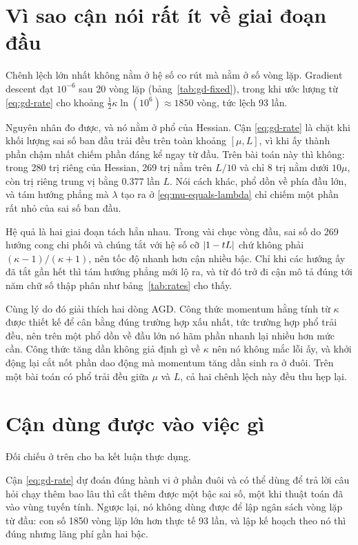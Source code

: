 \section{Vì sao cận nói rất ít về giai đoạn đầu}
\label{sec:theory-early}

Chênh lệch lớn nhất không nằm ở hệ số co rút mà nằm ở số vòng lặp. Gradient
descent đạt $10^{-6}$ sau 20 vòng lặp (bảng~\ref{tab:gd-fixed}), trong khi ước
lượng từ \eqref{eq:gd-rate} cho khoảng $\tfrac{1}{2}\kappa \ln(10^{6}) \approx
1850$ vòng, tức lệch 93 lần.

Nguyên nhân đo được, và nó nằm ở phổ của Hessian. Cận \eqref{eq:gd-rate} là chặt
khi khối lượng sai số ban đầu trải đều trên toàn khoảng $[\mu, L]$, vì khi ấy
thành phần chậm nhất chiếm phần đáng kể ngay từ đầu. Trên bài toán này thì không:
trong 280 trị riêng của Hessian, 269 trị nằm trên $L/10$ và chỉ 8 trị nằm dưới
$10\mu$, còn trị riêng trung vị bằng \num{0.377} lần $L$. Nói cách khác, phổ dồn
về phía đầu lớn, và tám hướng phẳng mà $\lambda$ tạo ra ở
\eqref{eq:mu-equals-lambda} chỉ chiếm một phần rất nhỏ của sai số ban đầu.

Hệ quả là hai giai đoạn tách hẳn nhau. Trong vài chục vòng đầu, sai số do 269
hướng cong chi phối và chúng tắt với hệ số cỡ $\lvert1 - tL\rvert$ chứ không phải
$(\kappa-1)/(\kappa+1)$, nên tốc độ nhanh hơn cận nhiều bậc. Chỉ khi các hướng ấy
đã tắt gần hết thì tám hướng phẳng mới lộ ra, và từ đó trở đi cận mô tả đúng tới
năm chữ số thập phân như bảng~\ref{tab:rates} cho thấy.

Cùng lý do đó giải thích hai dòng AGD. Công thức momentum hằng tính từ $\kappa$
được thiết kế để cân bằng đúng trường hợp xấu nhất, tức trường hợp phổ trải đều,
nên trên một phổ dồn về đầu lớn nó hãm phần nhanh lại nhiều hơn mức cần. Công
thức tăng dần không giả định gì về $\kappa$ nên nó không mắc lỗi ấy, và khởi động
lại cắt nốt phần dao động mà momentum tăng dần sinh ra ở đuôi. Trên một bài toán
có phổ trải đều giữa $\mu$ và $L$, cả hai chênh lệch này đều thu hẹp lại.

\section{Cận dùng được vào việc gì}
\label{sec:theory-use}

Đối chiếu ở trên cho ba kết luận thực dụng.

Cận \eqref{eq:gd-rate} dự đoán đúng hành vi ở phần đuôi và có thể dùng để trả lời
câu hỏi chạy thêm bao lâu thì cắt thêm được một bậc sai số, một khi thuật toán đã
vào vùng tuyến tính. Ngược lại, nó không dùng được để lập ngân sách vòng lặp từ
đầu: con số 1850 vòng lặp lớn hơn thực tế 93 lần, và lập kế hoạch theo nó thì
đúng nhưng lãng phí gần hai bậc.

